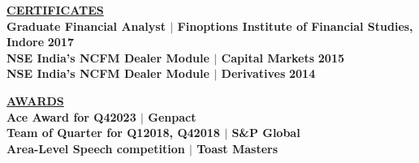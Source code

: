 \documentclass{article}
\begin{document}
\vspace{2mm}

\noindent \textbf{\underline{CERTIFICATES}} \\
\noindent \textbf{Graduate Financial Analyst $\mid$ Finoptions Institute of Financial Studies, Indore} \hfill \textbf{2017} \\
\noindent \textbf{NSE India’s NCFM Dealer Module $\mid$ Capital Markets} \hfill \textbf{2015} \\
\noindent \textbf{NSE India’s NCFM Dealer Module $\mid$ Derivatives } \hfill \textbf{2014} 

\vspace{2mm}

\noindent \textbf{\underline{AWARDS}} \\
\noindent \textbf{Ace Award for Q42023 $\mid$ Genpact} \\
\noindent \textbf{ Team of Quarter for Q12018, Q42018 $\mid$ S\&P Global}\\
\noindent \textbf{ Area-Level Speech competition $\mid$ Toast Masters}
\end{document}
